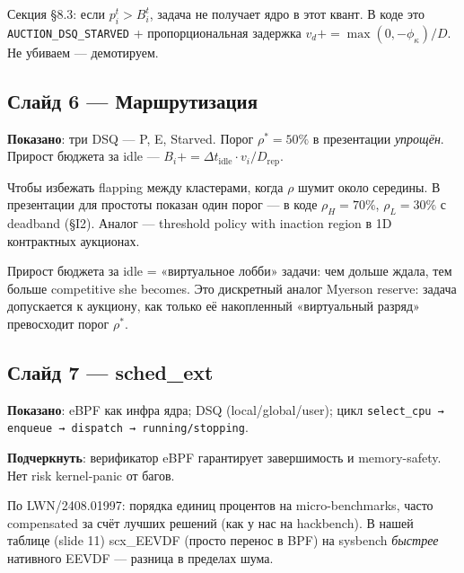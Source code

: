 \documentclass[11pt,a4paper]{article}
\begin{document}
\begin{ask}
Секция §8.3: если $p_i^t > B_i^t$, задача не получает ядро в этот
квант. В коде это \texttt{AUCTION\_DSQ\_STARVED} + пропорциональная
задержка $v_d+=\max(0,-\phi_\kappa)/D$. Не убиваем — демотируем.
\end{ask}

\subsection*{Слайд 6 — Маршрутизация}

\textbf{Показано}: три DSQ — P, E, Starved. Порог $\rho^*=50\%$ в
презентации \emph{упрощён}. Прирост бюджета за idle —
$B_i+=\Delta t_{\text{idle}}\cdot v_i/D_{\text{rep}}$.

\begin{ask}
Чтобы избежать flapping между кластерами, когда $\rho$ шумит около
середины. В презентации для простоты показан один порог — в коде
$\rho_H=70\%$, $\rho_L=30\%$ с deadband (§I2). Аналог — threshold
policy with inaction region в 1D контрактных аукционах.
\end{ask}

\begin{ask}
Прирост бюджета за idle = «виртуальное лобби» задачи: чем дольше
ждала, тем больше competitive she becomes. Это дискретный аналог
Myerson reserve: задача допускается к аукциону, как только её
накопленный «виртуальный разряд» превосходит порог $\rho^*$.
\end{ask}

\subsection*{Слайд 7 — sched\_ext}

\textbf{Показано}: eBPF как инфра ядра; DSQ (local/global/user);
цикл \texttt{select\_cpu → enqueue → dispatch → running/stopping}.

\textbf{Подчеркнуть}: верификатор eBPF гарантирует завершимость и
memory-safety. Нет risk kernel-panic от багов.

\begin{ask}
По LWN/2408.01997: порядка единиц процентов на micro-benchmarks,
часто compensated за счёт лучших решений (как у нас на hackbench).
В нашей таблице (slide 11) scx\_EEVDF (просто перенос в BPF) на
sysbench \emph{быстрее} нативного EEVDF — разница в пределах шума.
\end{ask}
\end{document}
